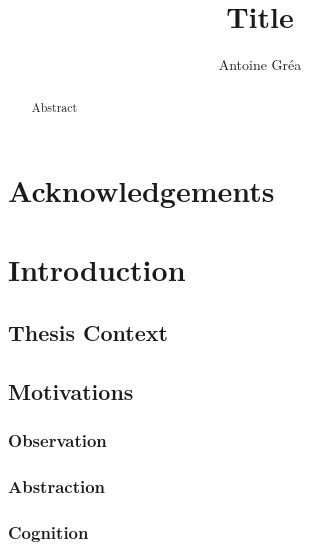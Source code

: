 \documentclass[11pt,a4paper,twoside,openright,titlepage,numbers=noenddot,headinclude,cleardoublepage=empty,openany]{scrreprt}
\title{Title}
\author{Antoine Gréa}
\date{}
\theoremstyle{plain}
\theoremstyle{definition}
\theoremstyle{remark}
\begin{document}
\maketitle
\begin{abstract}
\chapter*{Abstract}
\end{abstract}


\renewcommand*\contentsname{Table of Content}
{
\hypersetup{linkcolor=}
\setcounter{tocdepth}{4}
\tableofcontents
}
\hypertarget{acknowledgements}{%
\chapter*{Acknowledgements}\label{acknowledgements}}

\hypertarget{introduction}{%
\chapter*{Introduction}\label{introduction}}

\hypertarget{thesis-context}{%
\section{Thesis Context}\label{thesis-context}}

\hypertarget{motivations}{%
\section{Motivations}\label{motivations}}

\hypertarget{observation}{%
\subsection{Observation}\label{observation}}

\hypertarget{abstraction}{%
\subsection{Abstraction}\label{abstraction}}

\hypertarget{cognition}{%
\subsection{Cognition}\label{cognition}}
\end{document}
